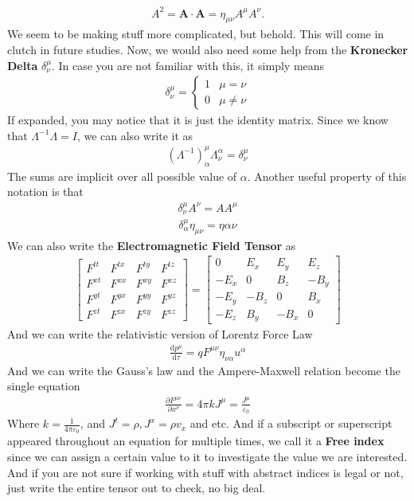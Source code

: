 \documentclass[11pt,letterpaper]{book}
\newcommand{\pypx}[2]{\frac{\partial #1}{\partial #2}}
\newcommand{\paren}[1]{\left( #1 \right)}
\newcommand{\etensor}[3]{#1_{#3}^{#2}}
\begin{document}
\begin{align}
A^2 = \mathbf{A} \cdot \mathbf{A} = \eta_{\mu \nu} A^\mu A^\nu. 
\end{align}
We seem to be making stuff more complicated, but behold. This will come in clutch in future studies. Now, we would also need some help from the \textbf{Kronecker Delta} $\etensor{\delta}{\mu}{\nu}$. In case you are not familiar with this, it simply means
\begin{align}
\etensor{\delta}{\mu}{\nu} = \begin{cases}
    1 &\mu=\nu\\
    0 &\mu\neq\nu
\end{cases}
\end{align}
If expanded, you may notice that it is just the identity matrix. Since we know that $\Lambda^{-1}\Lambda = I$, we can also write it as
\begin{align}
\etensor{\paren{\Lambda^{-1}}}{\mu}{\alpha}\etensor{\Lambda}{\alpha}{\nu} = \etensor{\delta}{\mu}{\nu}
\end{align}
The sums are implicit over all possible value of $\alpha$. Another useful property of this notation is that
\begin{align}
\etensor{\delta}{\mu}{\nu}A^{\nu } = AA^{\mu}
\end{align}
\begin{align}
\etensor{\delta}{\mu}{\alpha}\eta_{\mu\nu} = \eta{\alpha\nu}
\end{align}
We can also write the \textbf{Electromagnetic Field Tensor} as
\begin{align}
\begin{bmatrix}
F^{tt} & F^{tx} & F^{ty} & F^{tz} \\
F^{xt} & F^{xx} & F^{xy} & F^{xz} \\
F^{yt} & F^{yx} & F^{yy} & F^{yz} \\
F^{zt} & F^{zx} & F^{zy} & F^{zz}
\end{bmatrix}
=
\begin{bmatrix}
0 & E_x & E_y & E_z \\
-E_x & 0 & B_z & -B_y \\
-E_y & -B_z & 0 & B_x \\
-E_z & B_y & -B_x & 0
\end{bmatrix}
\end{align}  
And we can write the relativistic version of Lorentz Force Law
\begin{align}
\frac{\text{d}p^\mu}{\text{d}\tau}=qF^{\mu\nu}\eta_{\nu\alpha}u^{\alpha}
\end{align}
And we can write the Gauss's law and the Ampere-Maxwell relation become the single equation
\begin{align}
\pypx{F^{\mu\nu}}{x^\nu} = 4\pi k J^\mu = \frac{J^{\mu}}{\varepsilon_0}
\end{align}
Where $k = \frac{1}{4\pi\varepsilon_0}$, and $J^t = \rho,J^x=\rho v_x$ and etc. And if a subscript or superscript appeared throughout an equation for multiple times, we call it a \textbf{Free index} since we can assign a certain value to it to investigate the value we are interested. 
And if you are not sure if working with stuff with abstract indices is legal or not, just write the entire tensor out to check, no big deal. 
\end{document}
